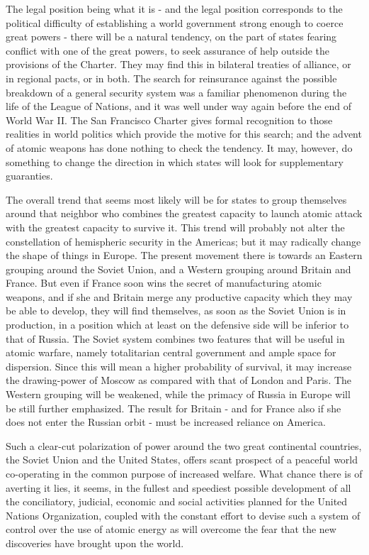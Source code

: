 The legal position being what it is - and the legal position corresponds to the political difficulty of establishing a world government strong enough to coerce great powers - there will be a natural tendency, on the part of states fearing conflict with one of the great powers, to seek assurance of help outside the provisions of the Charter. They may find this in bilateral treaties of alliance, or in regional pacts, or in both. The search for reinsurance against the possible breakdown of a general security system was a familiar phenomenon during the life of the League of Nations, and it was well under way again before the end of World War II. The San Francisco Charter gives formal recognition to those realities in world politics which provide the motive for this search; and the advent of atomic weapons has done nothing to check the tendency. It may, however, do something to change the direction in which states will look for supplementary guaranties.

The overall trend that seems most likely will be for states to group themselves around that neighbor who combines the greatest capacity to launch atomic attack with the greatest capacity to survive it. This trend will probably not alter the constellation of hemispheric security in the Americas; but it may radically change the shape of things in Europe. The present movement there is towards an Eastern grouping around the Soviet Union, and a Western grouping around Britain and France. But even if France soon wins the secret of manufacturing atomic weapons, and if she and Britain merge any productive capacity which they may be able to develop, they will find themselves, as soon as the Soviet Union is in production, in a position which at least on the defensive side will be inferior to that of Russia. The Soviet system combines two features that will be useful in atomic warfare, namely totalitarian central government and ample space for dispersion. Since this will mean a higher probability of survival, it may increase the drawing-power of Moscow as compared with that of London and Paris. The Western grouping will be weakened, while the primacy of Russia in Europe will be still further emphasized. The result for Britain - and for France also if she does not enter the Russian orbit - must be increased reliance on America.

Such a clear-cut polarization of power around the two great continental countries, the Soviet Union and the United States, offers scant prospect of a peaceful world co-operating in the common purpose of increased welfare. What chance there is of averting it lies, it seems, in the fullest and speediest possible development of all the conciliatory, judicial, economic and social activities planned for the United Nations Organization, coupled with the constant effort to devise such a system of control over the use of atomic energy as will overcome the fear that the new discoveries have brought upon the world.
